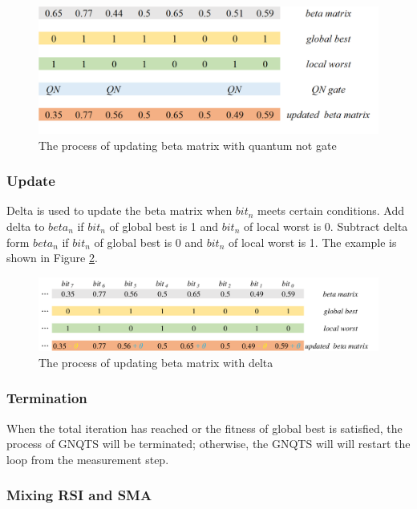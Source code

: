 \documentclass[../Proposed Method.tex]{subfiles}
\begin{document}
\begin{figure}[H]
    \centering
    \includegraphics[scale = 0.5] {figure/GN_gate.png}
    \caption{The process of updating beta matrix with quantum not gate}
    \label{GN_gate}
\end{figure}

\subsubsection{Update}

Delta is used to update the beta matrix when $bit_n$ meets certain conditions. Add delta to $beta_n$ if $bit_n$ of global best is 1 and $bit_n$ of local worst is 0. Subtract delta form $beta_n$ if $bit_n$ of global best is 0 and $bit_n$ of local worst is 1. The example is shown in Figure \ref{update}.

\begin{figure}[H]
    \centering
    \includegraphics[scale = 0.5] {figure/update.pdf}
    \caption{The process of updating beta matrix with delta}
    \label{update}
\end{figure}

\subsubsection{Termination}

When the total iteration has reached or the fitness of global best is satisfied, the process of GNQTS will be terminated; otherwise, the GNQTS will will restart the loop from the measurement step.

\subsubsection{Mixing RSI and SMA}
\end{document}
